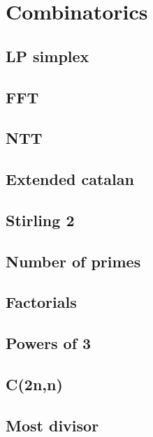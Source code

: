 \section{Combinatorics}
\subsection{LP simplex}
\raggedbottom
\hrulefill
\subsection{FFT}
\raggedbottom
\hrulefill
\subsection{NTT}
\raggedbottom
\hrulefill
\subsection{Extended catalan}

\hrulefill
\subsection{Stirling 2}

\hrulefill
\subsection{Number of primes}
\raggedbottom
\hrulefill
\subsection{Factorials}
\raggedbottom
\hrulefill
\subsection{Powers of 3}
\raggedbottom
\hrulefill
\subsection{C(2n,n)}
\raggedbottom
\hrulefill
\subsection{Most divisor}
\raggedbottom
\hrulefill
